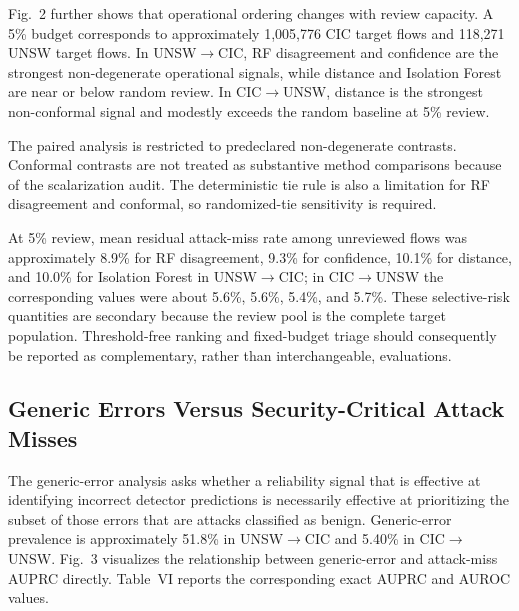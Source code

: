 \documentclass[conference]{IEEEtran}
\begin{document}
Fig.~2 further shows that operational ordering changes with review capacity. A 5\% budget corresponds to approximately 1,005,776 CIC target flows and 118,271 UNSW target flows. In UNSW$\rightarrow$CIC, RF disagreement and confidence are the strongest non-degenerate operational signals, while distance and Isolation Forest are near or below random review. In CIC$\rightarrow$UNSW, distance is the strongest non-conformal signal and modestly exceeds the random baseline at 5\% review.

The paired analysis is restricted to predeclared non-degenerate contrasts. Conformal contrasts are not treated as substantive method comparisons because of the scalarization audit. The deterministic tie rule is also a limitation for RF disagreement and conformal, so randomized-tie sensitivity is required.

At 5\% review, mean residual attack-miss rate among unreviewed flows was approximately 8.9\% for RF disagreement, 9.3\% for confidence, 10.1\% for distance, and 10.0\% for Isolation Forest in UNSW$\rightarrow$CIC; in CIC$\rightarrow$UNSW the corresponding values were about 5.6\%, 5.6\%, 5.4\%, and 5.7\%. These selective-risk quantities are secondary because the review pool is the complete target population. Threshold-free ranking and fixed-budget triage should consequently be reported as complementary, rather than interchangeable, evaluations.

\subsection{Generic Errors Versus Security-Critical Attack Misses}

The generic-error analysis asks whether a reliability signal that is effective at identifying incorrect detector predictions is necessarily effective at prioritizing the subset of those errors that are attacks classified as benign. Generic-error prevalence is approximately 51.8\% in UNSW$\rightarrow$CIC and 5.40\% in CIC$\rightarrow$UNSW. Fig.~3 visualizes the relationship between generic-error and attack-miss AUPRC directly. Table~VI reports the corresponding exact AUPRC and AUROC values.
\end{document}
